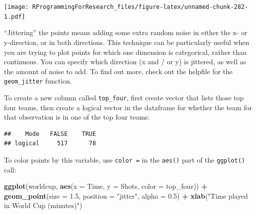 \documentclass[]{book}
\makeatletter
\newenvironment{Shaded}{\begin{snugshade}}{\end{snugshade}}
\newcommand{\KeywordTok}[1]{\textcolor[rgb]{0.13,0.29,0.53}{\textbf{#1}}}
\newcommand{\DataTypeTok}[1]{\textcolor[rgb]{0.13,0.29,0.53}{#1}}
\newcommand{\FloatTok}[1]{\textcolor[rgb]{0.00,0.00,0.81}{#1}}
\newcommand{\StringTok}[1]{\textcolor[rgb]{0.31,0.60,0.02}{#1}}
\newcommand{\OperatorTok}[1]{\textcolor[rgb]{0.81,0.36,0.00}{\textbf{#1}}}
\newcommand{\NormalTok}[1]{#1}
\newenvironment{kframe}{%
\medskip{}
\setlength{\fboxsep}{.8em}
 \def\at@end@of@kframe{}%
 \ifinner\ifhmode%
  \def\at@end@of@kframe{\end{minipage}}%
  \begin{minipage}{\columnwidth}%
 \fi\fi%
 \def\FrameCommand##1{\hskip\@totalleftmargin \hskip-\fboxsep
 \colorbox{shadecolor}{##1}\hskip-\fboxsep
     \hskip-\linewidth \hskip-\@totalleftmargin \hskip\columnwidth}%
 \MakeFramed {\advance\hsize-\width
   \@totalleftmargin\z@ \linewidth\hsize
   \@setminipage}}%
 {\par\unskip\endMakeFramed%
 \at@end@of@kframe}
\renewenvironment{Shaded}{\begin{kframe}}{\end{kframe}}
\newenvironment{rmdblock}[1]
  {
  \begin{itemize}
  \renewcommand{\labelitemi}{
    \raisebox{-.7\height}[0pt][0pt]{
      {\setkeys{Gin}{width=3em,keepaspectratio}\texttt{[image: images/\#1]}}
    }
  }
  \setlength{\fboxsep}{1em}
  \begin{kframe}
  \item
  }
  {
  \end{kframe}
  \end{itemize}
  }
\newenvironment{rmdnote}
  {\begin{rmdblock}{note}}
  {\end{rmdblock}}
\theoremstyle{definition}
\theoremstyle{definition}
\theoremstyle{definition}
\theoremstyle{remark}
\makeatother
\begin{document}
\texttt{[image: RProgrammingForResearch\_files/figure-latex/unnamed-chunk-282-1.pdf]}

\begin{rmdnote}
``Jittering'' the points means adding some extra random noise in either
the x- or y-direction, or in both directions. This technique can be
particularly useful when you are trying to plot points for which one
dimension is categorical, rather than continuous. You can specify which
direction (x and / or y) is jittered, as well as the amount of noise to
add. To find out more, check out the helpfile for the
\texttt{geom\_jitter} function.
\end{rmdnote}

To create a new column called \texttt{top\_four}, first create vector
that lists those top four teams, then create a logical vector in the
dataframe for whether the team for that observation is in one of the top
four teams:

\begin{Shaded}
\end{Shaded}

\begin{verbatim}
##    Mode   FALSE    TRUE 
## logical     517      78
\end{verbatim}

To color points by this variable, use \texttt{color\ =} in the
\texttt{aes()} part of the \texttt{ggplot()} call:

\begin{Shaded}
\begin{Highlighting}[]
\KeywordTok{ggplot}\NormalTok{(worldcup, }\KeywordTok{aes}\NormalTok{(}\DataTypeTok{x =}\NormalTok{ Time, }\DataTypeTok{y =}\NormalTok{ Shots,}
                     \DataTypeTok{color =}\NormalTok{ top_four)) }\OperatorTok{+}
\StringTok{        }\KeywordTok{geom_point}\NormalTok{(}\DataTypeTok{size =} \FloatTok{1.5}\NormalTok{, }\DataTypeTok{position =} \StringTok{"jitter"}\NormalTok{,}
                   \DataTypeTok{alpha =} \FloatTok{0.5}\NormalTok{)  }\OperatorTok{+}\StringTok{ }
\StringTok{        }\KeywordTok{xlab}\NormalTok{(}\StringTok{"Time played in World Cup (minutes)"}\NormalTok{)}
\end{Highlighting}
\end{Shaded}
\end{document}
